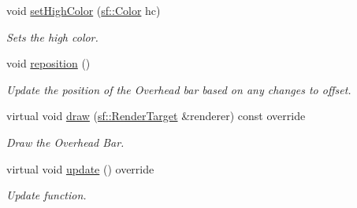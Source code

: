 \begin{DoxyCompactItemize}
void \mbox{\hyperlink{class_overhead_bar_aed93064fe3cd93824551d45c6ca640e4}{set\+High\+Color}} (\mbox{\hyperlink{classsf_1_1_color}{sf\+::\+Color}} hc)
\begin{DoxyCompactList}\small\item\em Sets the high color. \end{DoxyCompactList}\item 
\mbox{\label{class_overhead_bar_a6b853c38def3955031338d1db969572e}} 
void \mbox{\hyperlink{class_overhead_bar_a6b853c38def3955031338d1db969572e}{reposition}} ()
\begin{DoxyCompactList}\small\item\em Update the position of the Overhead bar based on any changes to offset. \end{DoxyCompactList}\item 
virtual void \mbox{\hyperlink{class_overhead_bar_aea7d4256cfe835b2e150e4e6689a4236}{draw}} (\mbox{\hyperlink{classsf_1_1_render_target}{sf\+::\+Render\+Target}} \&renderer) const override
\begin{DoxyCompactList}\small\item\em Draw the Overhead Bar. \end{DoxyCompactList}\item 
\mbox{\label{class_overhead_bar_aae76b0fe16f692d330caa057b255804d}} 
virtual void \mbox{\hyperlink{class_overhead_bar_aae76b0fe16f692d330caa057b255804d}{update}} () override
\begin{DoxyCompactList}\small\item\em Update function. \end{DoxyCompactList}\end{DoxyCompactItemize}
